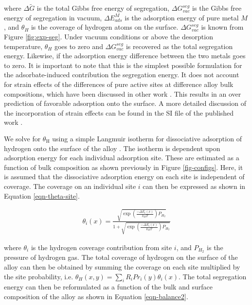 \documentclass[12pt,oneside]{cmuthesis}
\begin{document}
\noindent
where \(\Delta \widetilde{G}\) is the total Gibbs free energy of segregation, \(\Delta G^{seg}_{vac}\) is the Gibbs free energy of segregation in vacuum, \(\Delta E^{M}_{ads}\) is the adsorption energy of pure metal \(M\), and \(\theta_{H}\) is the coverage of hydrogen atoms on the surface. \(\Delta G^{seg}_{vac}\) is known from Figure \ref{fig:exp-seg}.  Under vacuum conditions or above the desorption temperature, \(\theta_{H}\) goes to zero and \(\Delta G^{seg}_{vac}\) is recovered as the total segregation energy. Likewise, if the adsorption energy difference between the two metals goes to zero. It is important to note that this is the simplest possible formulation for the adsorbate-induced contribution the segregation energy. It does not account for strain effects of the differences of pure active sites at difference alloy bulk compositions, which have been discussed in other work \cite{roudgar-2005-hydrog}. This results in an over prediction of favorable adsorption onto the surface. A more detailed discussion of the incorporation of strain effects can be found in the SI file of the published work \cite{boes-2015-estim-bulk}.

We solve for \(\theta_{\text{H}}\) using a simple Langmuir isotherm for dissociative adsorption of hydrogen onto the surface of the alloy \cite{miller-2012-segreg-at}. The isotherm is dependent upon adsorption energy for each individual adsorption site. These are estimated as a function of bulk composition as shown previously in Figure \ref{fig-configs}. Here, it is assumed that the dissociative adsorption energy on each site is independent of coverage. The coverage on an individual site \(i\) can then be expressed as shown in Equation \eqref{eqn-theta-site}.

\begin{eqnarray}
\theta_{i} (x) = \frac{\sqrt{\exp\left(\frac{-\Delta E_{i}(x)}{k_{B} T}\right) P_{H_2}}}{1 + \sqrt{\exp\left(\frac{-\Delta E_{i}(x)}{k_{B} T}\right) P_{H_2}}}
\label{eqn-theta-site}
\end{eqnarray}

\noindent
where \(\theta_{i}\) is the hydrogen coverage contribution from site \(i\), and \(P_{H_2}\) is the pressure of hydrogen gas. The total coverage of hydrogen on the surface of the alloy can then be obtained by summing the coverage on each site multiplied by the site probability, i.e. \(\theta_{H} (x,y) = \sum\limits_i R_{i} Pr_{i}(y) \theta_{i} (x)\). The total segregation energy can then be reformulated as a function of the bulk and surface composition of the alloy as shown in Equation \eqref{eqn-balance2}.
\end{document}
